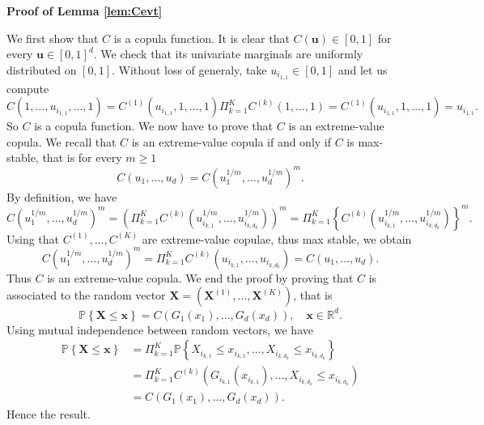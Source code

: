 \documentclass[11pt]{article}
\makeatletter
\renewenvironment{proof}[1][\proofname]{\par
\pushQED{\qed}%
\normalfont \topsep6\p@\@plus6\p@\relax
\trivlist
\item\relax
{\textbf{
#1\@addpunct{ }}}\hspace\labelsep\ignorespaces
}{%
\popQED\endtrivlist\@endpefalse
}
\makeatother
\begin{document}
	\begin{proof}[Proof of Lemma \ref{lem:Cevt}]
		We first show that $C$ is a copula function. It is clear that $C(\textbf{u}) \in [0,1]$ for every $\textbf{u} \in [0,1]^d$. We check that its univariate marginals are uniformly distributed on $[0,1]$. Without loss of generaly, take $u_{i_{1,1}} \in [0,1]$ and let us compute 
		\begin{equation*}
			C(1, \dots, u_{i_{1,1}}, \dots, 1) = C^{(1)}(u_{i_{1,1}}, 1, \dots, 1) \Pi_{k=1}^K C^{(k)}(1,\dots,1) = C^{(1)}(u_{i_{1,1}}, 1, \dots, 1) = u_{i_{1,1}}.
		\end{equation*}
		So $C$ is a copula function. We now have to prove that $C$ is an extreme-value copula. We recall that $C$ is an extreme-value copula if and only if $C$ is max-stable, that is for every $m \geq 1$
		\begin{equation*}
			C(u_1,\dots, u_d) = C(u_1^{1/m}, \dots, u_d^{1/m})^m.
		\end{equation*}
		By definition, we have
		\begin{equation*}
			C(u_1^{1/m}, \dots, u_d^{1/m})^m = \left( \Pi_{k=1}^K C^{(k)}\left(u_{i_{k,1}}^{1/m}, \dots, u_{i_{k,d_k}}^{1/m}\right) \right)^m = \Pi_{k=1}^K  \left\{ C^{(k)}\left(u_{i_{k,1}}^{1/m}, \dots, u_{i_{k,d_k}}^{1/m}\right) \right\}^m.
		\end{equation*}
		Using that $C^{(1)}, \dots, C^{(K)}$ are extreme-value copulae, thus max stable, we obtain
		\begin{equation*}
			C(u_1^{1/m}, \dots, u_d^{1/m})^m = \Pi_{k=1}^K C^{(k)}\left(u_{i_{k,1}}, \dots, u_{i_{k,d_k}}\right) = C(u_1, \dots, u_d).
		\end{equation*}
		Thus $C$ is an extreme-value copula. We end the proof by proving that $C$ is associated to the random vector $\textbf{X} = (\textbf{X}^{(1)}, \dots, \textbf{X}^{(K)})$, that is
		\begin{equation*}
			\mathbb{P} \left\{ \textbf{X} \leq \textbf{x} \right\} = C(G_1(x_1), \dots, G_d(x_d)), \quad \textbf{x} \in \mathbb{R}^d.
		\end{equation*}
		Using mutual independence between random vectors, we have
		\begin{align*}
			\mathbb{P}\left\{ \textbf{X} \leq \textbf{x} \right\} &= \Pi_{k=1}^K \mathbb{P}\left\{ X_{i_{k,1}} \leq x_{i_{k,1}}, \dots, X_{i_{k,d_k}} \leq x_{i_{k,d_k}} \right\} \\ &= \Pi_{k=1}^K C^{(k)}\left(G_{i_{k,1}}(x_{i_{k,1}}), \dots, X_{i_{k,d_k}} \leq x_{i_{k,d_k}} \right) \\ &= C(G_1(x_1), \dots, G_d(x_d)).
		\end{align*}
		Hence the result.
	\end{proof}
	
\end{document}
